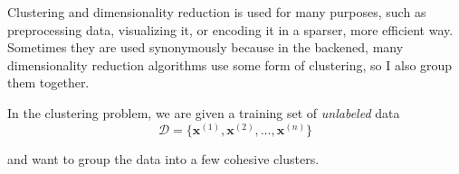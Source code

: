 Clustering and dimensionality reduction is used for many purposes, such as preprocessing data, visualizing it, or encoding it in a sparser, more efficient way. Sometimes they are used synonymously because in the backened, many dimensionality reduction algorithms use some form of clustering, so I also group them together. 

In the clustering problem, we are given a training set of \textit{unlabeled} data
\begin{equation}
  \mathcal{D} = \{ \mathbf{x}^{(1)}, \mathbf{x}^{(2)}, \ldots, \mathbf{x}^{(n)}\}
\end{equation}

and want to group the data into a few cohesive clusters. 


